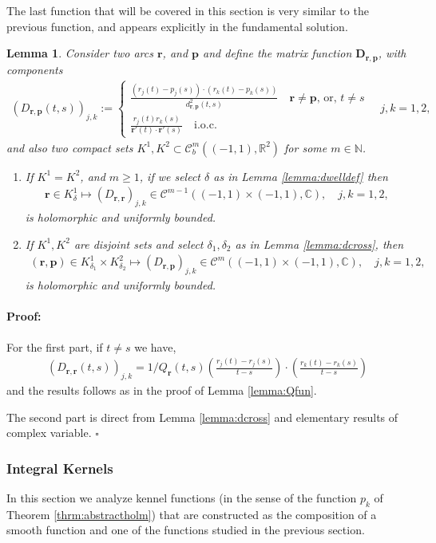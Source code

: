 \documentclass{article}
\newtheorem{lemma}[theorem]{Lemma}
\newenvironment{proof}{\paragraph{Proof:}}{\hfill$\square$}
\newcommand{\IC}{{\mathbb C}}
\newcommand{\IN}{{\mathbb N}}
\newcommand{\IR}{{\mathbb R}}
\newcommand{\bp}{{\bm p}}
\newcommand{\cmspace}[3]{\mathcal{C}^{#1} \left( #2, #3 \right)}
\newcommand{\rgeo}[1]{\mathcal{C}_b^{#1}\left( (-1,1), \IR^2 \right)}
\newcommand{\br}{\bm{r}}
\begin{document}
The last function that will be covered in this section is very similar to the previous function, and appears explicitly in the fundamental solution.

\begin{lemma}
\label{lemma:Dmatrix}
Consider two arcs $\br$, and $\bp$ and define the matrix function $\mathbf{D}_{\br,\bp}$, with components
\begin{align*}
(D_{\br,\bp}(t,s))_{j,k} :=  \begin{cases}
\frac{(r_j(t)-p_j(s))\cdot (r_k(t)-p_k(s))}{d_{\br,\bp}^2(t,s)} \quad \br \neq \bp\text{, or, } t \neq s \\
\frac{r_j(t) r_k(s)}{\br'(t)\cdot \br'(s)} \quad \text{i.o.c.} 
\end{cases} \quad j,k=1,2,
\end{align*} 
and also two compact sets $K^1,K^2 \subset \rgeo{m}$ for some $m \in \IN$. 
\begin{enumerate}
\item
If $K^1 = K^2$, and $m \geq 1$, if we select $\delta$ as in Lemma \ref{lemma:dwelldef} then 
\begin{align*}
\br \in K^1_\delta \mapsto ({D}_{\br,\br})_{j,k} \in \cmspace{m-1}{(-1,1)\times(-1,1)}{\IC}, \quad j,k =1,2,
\end{align*} 
is holomorphic and uniformly bounded.
\item 
If $K^1, K^2$ are disjoint sets and select $\delta_1, \delta_2$ as in Lemma \ref{lemma:dcross}, then 
\begin{align*}
(\br,\bp)  \in K^1_{\delta_1} \times K^2_{\delta_2} \mapsto ({D}_{\br,\bp})_{j,k} \in \cmspace{m}{(-1,1)\times(-1,1)}{\IC}, \quad j,k =1,2,
\end{align*} 
is holomorphic and uniformly bounded.
\end{enumerate}
\end{lemma} 
\begin{proof}
For the first part, if $t \neq s$ we have, 
\begin{align*}
(D_{\br,\br}(t,s))_{j,k} = 1/Q_{\br}(t,s) \left( \frac{r_j(t)-r_j(s)}{t-s} \right) \cdot \left( \frac{r_k(t)-r_k(s)}{t-s} \right)
\end{align*}
and the results follows as in the proof of Lemma \ref{lemma:Qfun}.

The second part is direct from Lemma \ref{lemma:dcross} and elementary results of complex variable. 
\end{proof}

\subsubsection{Integral Kernels}
\label{sec:IntegralKernels}
In this section we analyze kennel functions (in the sense of the function $p_k$ of Theorem \ref{thrm:abstractholm}) that are constructed as the composition of a smooth function and one of the functions studied in the previous section. 
\end{document}
